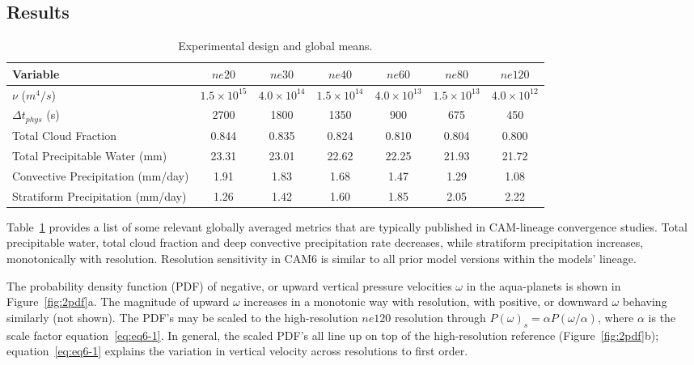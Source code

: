 \subsection{Results}

 \begin{table}
 \caption{Experimental design and global means.}
 \centering
 \scriptsize
 \begin{tabular}{lcccccc}
   \hline
   Variable & $ne20$ & $ne30$ & $ne40$ & $ne60$ & $ne80$ & $ne120$ \\
   \hline
   $\nu$ ($m^4/s$) & $1.5 \times 10^{15}$ & $4.0 \times 10^{14}$ & $1.5 \times 10^{14}$ & $4.0 \times 10^{13}$  & $1.5 \times 10^{13}$ & $4.0 \times 10^{12}$\\
    $\Delta t_{phys}$ (s) & 2700 & 1800 & 1350 & 900 & 675 & 450 \\
   Total Cloud Fraction & 0.844 & 0.835 & 0.824 & 0.810 & 0.804 & 0.800 \\ 
   Total Precipitable Water (mm) & 23.31& 23.01 & 22.62 & 22.25 & 21.93 & 21.72 \\
   Convective Precipitation (mm/day) & 1.91 & 1.83 & 1.68 & 1.47 & 1.29 & 1.08 \\
   Stratiform Precipitation (mm/day) & 1.26 & 1.42 & 1.60 & 1.85 & 2.05 & 2.22 \\      
 \hline
 \end{tabular}
 \label{tbl:table6-1}
 \end{table}

Table~\ref{tbl:table6-1} provides a list of some relevant globally averaged metrics that are typically published in CAM-lineage convergence studies. Total precipitable water, total cloud fraction and deep convective precipitation rate decreases, while stratiform precipitation increases, monotonically with resolution. Resolution sensitivity in CAM6 is similar to all prior model versions within the models' lineage. 

The probability density function (PDF) of negative, or upward vertical pressure velocities $\omega$ in the aqua-planets is shown in Figure~\ref{fig:2pdf}a. The magnitude of upward $\omega$ increases in a monotonic way with resolution, with positive, or downward $\omega$ behaving similarly (not shown). The PDF's may be scaled to the high-resolution $ne120$ resolution through $P(\omega)_s = \alpha P (\omega / \alpha)$, where $\alpha$ is the scale factor equation~\ref{eq:eq6-1}. In general, the scaled PDF's all line up on top of the high-resolution reference (Figure~\ref{fig:2pdf}b); equation~\ref{eq:eq6-1} explains the variation in vertical velocity across resolutions to first order. 

